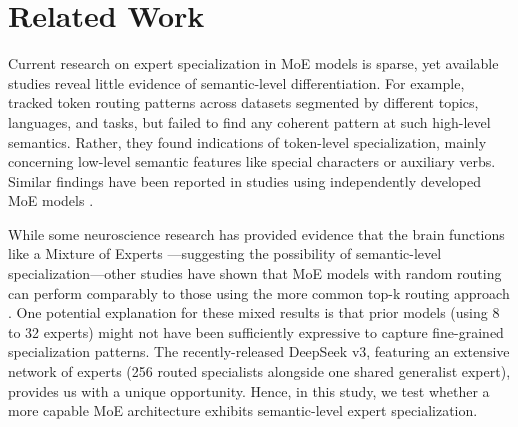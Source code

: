 \section{Related Work}
Current research on expert specialization in MoE models is sparse, yet available studies reveal little evidence of semantic-level differentiation. For example, \citet{xue2024openmoe} tracked token routing patterns across datasets segmented by different topics, languages, and tasks, but failed to find any coherent pattern at such high-level semantics. Rather, they found indications of token-level specialization, mainly concerning low-level semantic features like special characters or auxiliary verbs. Similar findings have been reported in studies using independently developed MoE models \citep[e.g.,][]{zoph2022stmoe, jiang2024mixtral, fan2024towards}.

While some neuroscience research has provided evidence that the brain functions like a Mixture of Experts \citep{stocco2010conditional,o2021and}---suggesting the possibility of semantic-level specialization---other studies have shown that MoE models with random routing can perform comparably to those using the more common top-k routing approach \citep{roller2021hash, zuo2021taming, ren2023pangu}. One potential explanation for these mixed results is that prior models (using 8 to 32 experts) might not have been sufficiently expressive to capture fine-grained specialization patterns. The recently-released DeepSeek v3, featuring an extensive network of experts (256 routed specialists alongside one shared generalist expert), provides us with a unique opportunity. Hence, in this study, we test whether a more capable MoE architecture exhibits semantic-level expert specialization.
